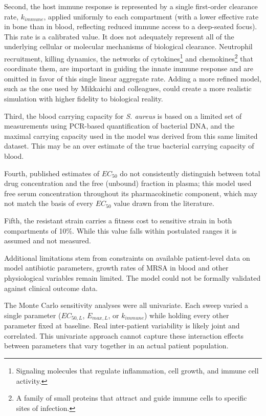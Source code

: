 \documentclass[journal]{IEEEtran}
\begin{document}
Second, the host immune response is represented by a single first-order
clearance rate, $k_{immune}$, applied uniformly to each compartment (with
a lower effective rate in bone than in blood, reflecting reduced immune
access to a deep-seated focus). This rate is a calibrated value.  It does not adequately represent all of the underlying cellular or molecular mechanisms of biological clearance. Neutrophil recruitment, killing dynamics,
the networks of cytokines\footnote{Signaling molecules that regulate
inflammation, cell growth, and immune cell activity.} and
chemokines\footnote{A family of small proteins that attract and guide
immune cells to specific sites of infection.} that coordinate them, are
important in guiding the innate immune response and are omitted in favor of this single linear aggregate rate.  Adding a more refined model, such as the one used by Mikkaichi and colleagues, could create a more realistic simulation with higher fidelity to biological reality.

Third, the blood carrying capacity for \textit{S. aureus} is based on a
limited set of measurements using PCR-based quantification of bacterial
DNA, and the maximal carrying capacity used in the model was derived from
this same limited dataset.  This may be an over estimate of the true bacterial carrying capacity of blood.

Fourth, published estimates of $EC_{50}$ do not consistently distinguish
between total drug concentration and the free (unbound) fraction in
plasma; this model used free serum concentration throughout its
pharmacokinetic component, which may not match the basis of every $EC_{50}$
value drawn from the literature.

Fifth, the resistant strain carries a fitness cost to sensitive strain in both compartments of
10\%. While this value falls within postulated ranges it is assumed and not measured.

Additional limitations stem from constraints on available patient-level
data on model antibiotic parameters, growth rates of
MRSA in blood and other physiological variables remain limited.  The
model could not be formally validated against clinical outcome data.

The Monte Carlo sensitivity analyses were all univariate. Each sweep varied
a single parameter ($EC_{50,L}$, $E_{max,L}$, or $k_{immune}$) while
holding every other parameter fixed at baseline. Real
inter-patient variability is likely joint and correlated.  This univariate approach cannot capture
these interaction effects between parameters that vary together in an actual
patient population.
\end{document}
